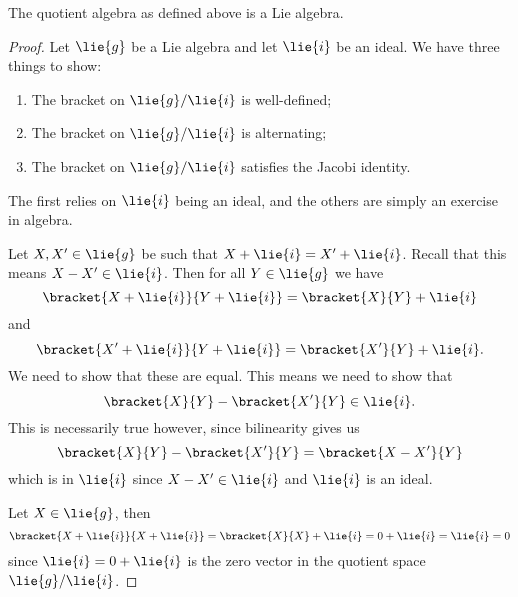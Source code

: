 \documentclass[fleqn]{NotesClass}
\begin{document}
    \begin{lma}{}{}
        The quotient algebra as defined above is a Lie algebra.
        \begin{proof}
            Let \(\lie{g}\) be a Lie algebra and let \(\lie{i}\) be an ideal.
            We have three things to show:
            \begin{enumerate}
                \item The bracket on \(\lie{g}/\lie{i}\) is well-defined;
                \item The bracket on \(\lie{g}/\lie{i}\) is alternating;
                \item The bracket on \(\lie{g}/\lie{i}\) satisfies the Jacobi identity.
            \end{enumerate}
            The first relies on \(\lie{i}\) being an ideal, and the others are simply an exercise in algebra.
            
            Let \(X, X' \in \lie{g}\) be such that \(X + \lie{i} = X' + \lie{i}\).
            Recall that this means \(X - X' \in \lie{i}\).
            Then for all \(Y \in \lie{g}\) we have
            \begin{equation}
                \bracket{X + \lie{i}}{Y + \lie{i}} = \bracket{X}{Y} + \lie{i}
            \end{equation}
            and
            \begin{equation}
                \bracket{X' + \lie{i}}{Y + \lie{i}} = \bracket{X'}{Y} + \lie{i}.
            \end{equation}
            We need to show that these are equal.
            This means we need to show that
            \begin{equation}
                \bracket{X}{Y} - \bracket{X'}{Y} \in \lie{i}.
            \end{equation}
            This is necessarily true however, since bilinearity gives us
            \begin{equation}
                \bracket{X}{Y} - \bracket{X'}{Y} = \bracket{X - X'}{Y}
            \end{equation}
            which is in \(\lie{i}\) since \(X - X' \in \lie{i}\) and \(\lie{i}\) is an ideal.
            
            Let \(X \in \lie{g}\), then
            \begin{equation}
                \bracket{X + \lie{i}}{X + \lie{i}} = \bracket{X}{X} + \lie{i} = 0 + \lie{i} = \lie{i} = 0
            \end{equation}
            since \(\lie{i} = 0 + \lie{i}\) is the zero vector in the quotient space \(\lie{g}/\lie{i}\).
            

\end{proof}
\end{lma}
\end{document}
